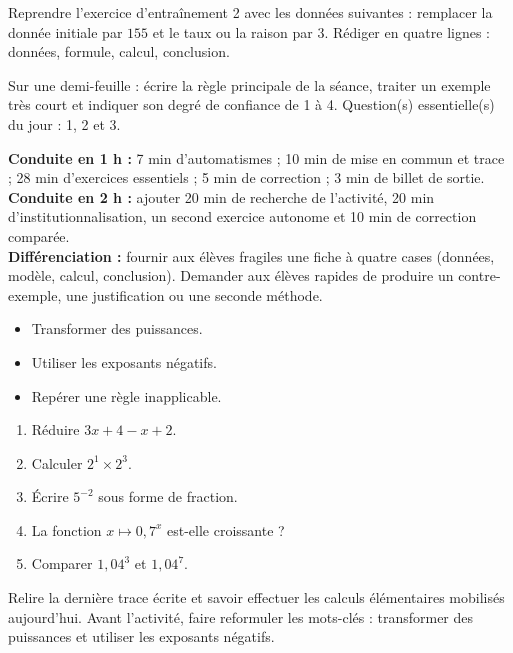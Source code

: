 
\begin{dm}Reprendre l'exercice d'entraînement 2 avec les données suivantes : remplacer la donnée initiale par $155$ et le taux ou la raison par $3$. Rédiger en quatre lignes : données, formule, calcul, conclusion.\end{dm}

\begin{sortie}Sur une demi-feuille : écrire la règle principale de la séance, traiter un exemple très court et indiquer son degré de confiance de 1 à 4. Question(s) essentielle(s) du jour : 1, 2 et 3.\end{sortie}

\ifprof
\begin{methode}
\textbf{Conduite en 1 h :} 7 min d'automatismes ; 10 min de mise en commun et trace ; 28 min d'exercices essentiels ; 5 min de correction ; 3 min de billet de sortie.\\
\textbf{Conduite en 2 h :} ajouter 20 min de recherche de l'activité, 20 min d'institutionnalisation, un second exercice autonome et 10 min de correction comparée.\\
\textbf{Différenciation :} fournir aux élèves fragiles une fiche à quatre cases (données, modèle, calcul, conclusion). Demander aux élèves rapides de produire un contre-exemple, une justification ou une seconde méthode.
\end{methode}
\fi
{}
\begin{objectifs}\begin{itemize}\item Transformer des puissances.\item Utiliser les exposants négatifs.\item Repérer une règle inapplicable.\end{itemize}\end{objectifs}
\begin{automatismes}\begin{enumerate}\item Réduire $3x+4-x+2$. \item Calculer $2^1\times2^3$. \item Écrire $5^{-2}$ sous forme de fraction. \item La fonction $x\mapsto0{,}7^x$ est-elle croissante ? \item Comparer $1{,}04^3$ et $1{,}04^7$. \end{enumerate}\end{automatismes}
\begin{prerequis}Relire la dernière trace écrite et savoir effectuer les calculs élémentaires mobilisés aujourd'hui. Avant l'activité, faire reformuler les mots-clés : transformer des puissances et utiliser les exposants négatifs.\end{prerequis}

